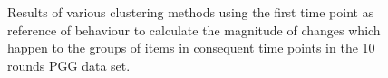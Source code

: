 \begin{figure}[!h]
{\begin{minipage}{\dimexpr \textwidth-2\fboxsep-2\fboxrule}
\end{minipage}}
\caption{Results of various clustering methods using the first time point as reference of behaviour to calculate the magnitude of changes which happen to the groups of items in consequent time points in the 10 rounds PGG data set.}
\label{fig:game10_ChangeMeasuers_Firs}
\end{figure}
    
    
    
\begin{figure}[!h]
\hfill{\begin{minipage}{\dimexpr \textwidth-2\fboxsep-2\fboxrule}%
        \centering
        \\
        

\end{minipage}}
\end{figure}
